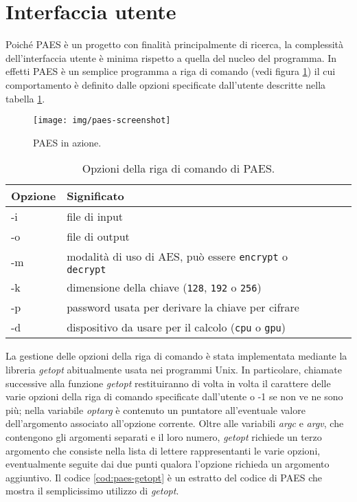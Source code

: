 \documentclass[12pt,a4paper,oneside]{book}
\begin{document}
\section{Interfaccia utente}
\label{sec:paes-cli}

Poiché PAES è un progetto con finalità principalmente di ricerca, la complessità dell'interfaccia utente è minima rispetto a quella del nucleo del programma. In effetti PAES è un semplice programma a riga di comando (vedi figura \ref{fig:paes-screenshot}) il cui comportamento è definito dalle opzioni specificate dall'utente descritte nella tabella \ref{tab:paes-opzioni}.

\begin{figure}[h]
\begin{center}
\texttt{[image: img/paes-screenshot]}
\caption{PAES in azione.\label{fig:paes-screenshot}}
\end{center}
\end{figure}

\begin{table}[h]
\begin{center}
\begin{tabular}{|l|l|l|l|l|}
\hline
\textbf{Opzione} &  \textbf{Significato} \\
\hline
-i & file di input \\
\hline
-o & file di output \\
\hline
-m & modalità di uso di \ac{AES}, può essere \verb|encrypt| o \verb|decrypt| \\
\hline
-k & dimensione della chiave (\verb|128|, \verb|192| o \verb|256|) \\
\hline
-p & password usata per derivare la chiave per cifrare \\
\hline
-d & dispositivo da usare per il calcolo (\verb|cpu| o \verb|gpu|) \\
\hline
\end{tabular}
\caption{Opzioni della riga di comando di PAES.\label{tab:paes-opzioni}}
\end{center}
\end{table}

La gestione delle opzioni della riga di comando è stata implementata mediante la libreria \textit{getopt} abitualmente usata nei programmi Unix. In particolare, chiamate successive alla funzione \textit{getopt} restituiranno di volta in volta il carattere delle varie opzioni della riga di comando specificate dall'utente o -1 se non ve ne sono più; nella variabile \textit{optarg} è contenuto un puntatore all'eventuale valore dell'argomento associato all'opzione corrente. Oltre alle variabili \textit{argc} e \textit{argv}, che contengono gli argomenti separati e il loro numero, \textit{getopt} richiede un terzo argomento che consiste nella lista di lettere rappresentanti le varie opzioni, eventualmente seguite dai due punti qualora l'opzione richieda un argomento aggiuntivo. Il codice \ref{cod:paes-getopt} è un estratto del codice di PAES che mostra il semplicissimo utilizzo di \textit{getopt}.
\end{document}
